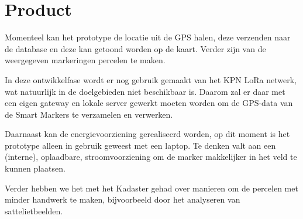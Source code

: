 \section{Product}
Momenteel kan het prototype de locatie uit de GPS halen, deze verzenden naar de
database en deze kan getoond worden op de kaart. Verder zijn van de weergegeven
markeringen percelen te maken.

In deze ontwikkelfase wordt er nog gebruik gemaakt van het KPN LoRa netwerk, wat
natuurlijk in de doelgebieden niet beschikbaar is. Daarom zal er daar met een
eigen gateway en lokale server gewerkt moeten worden om de GPS-data van de Smart
Markers te verzamelen en verwerken.

Daarnaast kan de energievoorziening gerealiseerd worden, op dit moment is het
prototype alleen in gebruik geweest met een laptop. Te denken valt aan een
(interne), oplaadbare, stroomvoorziening om de marker makkelijker in het veld te
kunnen plaatsen.

Verder hebben we het met het Kadaster gehad over manieren om de percelen met
minder handwerk te maken, bijvoorbeeld door het analyseren van sattelietbeelden.
